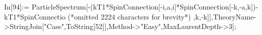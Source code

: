 In[94]:= ParticleSpectrum[-(kT1*SpinConnection[-i,a,i]*SpinConnection[-k,-a,k])-kT1*SpinConnectio (*omitted 2224 characters for brevity*) ,k,-k]],TheoryName->StringJoin["Case",ToString[52]],Method->"Easy",MaxLaurentDepth->3];